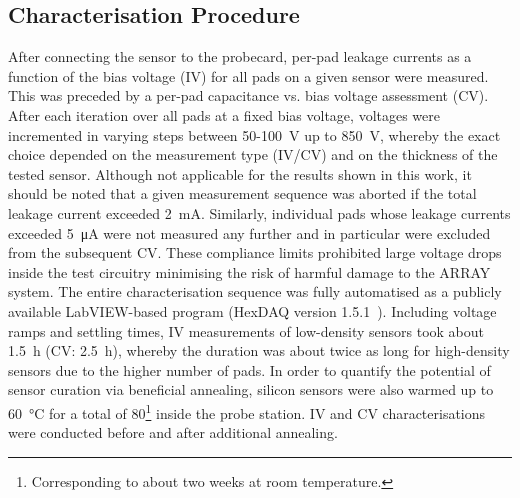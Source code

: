 \subsection{Characterisation Procedure}
\label{subsec:setup_procedure}
After connecting the sensor to the probecard, per-pad leakage currents as a function of the bias voltage (IV) for all pads on a given sensor were measured.
This was preceded by a per-pad capacitance vs. bias voltage assessment (CV).
After each iteration over all pads at a fixed bias voltage, voltages were incremented in varying steps between 50-\SI{100}{\volt} up to \SI{850}{\volt}, whereby the exact choice depended on the measurement type (IV/CV) and on the thickness of the tested sensor.
Although not applicable for the results shown in this work, it should be noted that a given measurement sequence was aborted if the total leakage current exceeded \SI{2}{\milli\ampere}.
Similarly, individual pads whose leakage currents exceeded \SI{5}{\micro\ampere} were not measured any further and in particular were excluded from the subsequent CV.
These compliance limits prohibited large voltage drops inside the test circuitry minimising the risk of harmful damage to the ARRAY system.
The entire characterisation sequence was fully automatised as a publicly available LabVIEW-based program (HexDAQ version 1.5.1~\cite{labview_hexdaq}).
Including voltage ramps and settling times, IV measurements of low-density sensors took about \SI{1.5}{\hour} (CV: \SI{2.5}{\hour}), whereby the duration was about twice as long for high-density sensors due to the higher number of pads.
In order to quantify the potential of sensor curation via beneficial annealing, silicon sensors were also warmed up to \SI{60}{\celsius} for a total of \SI{80}{\min}\footnote{Corresponding to about two weeks at room temperature.} inside the probe station.
IV and CV characterisations were conducted before and after additional annealing.